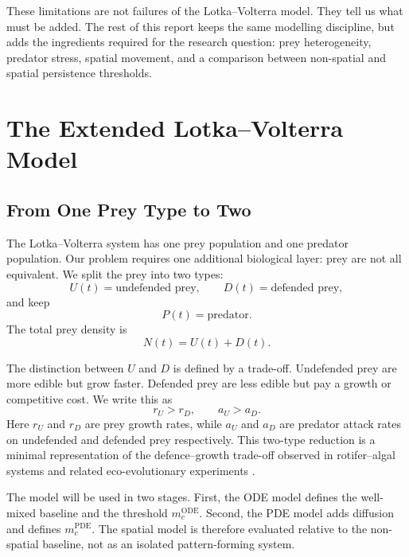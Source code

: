 \documentclass[12pt,letterpaper]{article}
\numberwithin{equation}{section}
\begin{document}
These limitations are not failures of the Lotka--Volterra model. They tell us what
must be added. The rest of this report keeps the same modelling discipline, but adds
the ingredients required for the research question: prey heterogeneity, predator
stress, spatial movement, and a comparison between non-spatial and spatial persistence
thresholds.

\section{The Extended Lotka--Volterra Model}

\subsection{From One Prey Type to Two}

The Lotka--Volterra system has one prey population and one predator population. Our
problem requires one additional biological layer: prey are not all equivalent. We split
the prey into two types:
\begin{equation}
    U(t)=\text{undefended prey}, \qquad
    D(t)=\text{defended prey},
\end{equation}
and keep
\begin{equation}
    P(t)=\text{predator}.
\end{equation}
The total prey density is
\begin{equation}
    N(t)=U(t)+D(t).
\end{equation}

The distinction between $U$ and $D$ is defined by a trade-off. Undefended prey are
more edible but grow faster. Defended prey are less edible but pay a growth or
competitive cost. We write this as
\begin{equation}
    r_U>r_D,
    \qquad
    a_U>a_D.
\end{equation}
Here $r_U$ and $r_D$ are prey growth rates, while $a_U$ and $a_D$ are predator attack
rates on undefended and defended prey respectively. This two-type reduction is a
minimal representation of the defence--growth trade-off observed in rotifer--algal
systems and related eco-evolutionary experiments \cite{kasada2014,hermann2024}.

The model will be used in two stages. First, the ODE model defines the well-mixed
baseline and the threshold $m_c^{\mathrm{ODE}}$. Second, the PDE model adds diffusion
and defines $m_c^{\mathrm{PDE}}$. The spatial model is therefore evaluated relative to
the non-spatial baseline, not as an isolated pattern-forming system.
\end{document}
